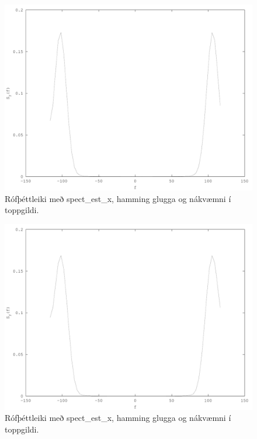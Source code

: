 \documentclass[11pt,a4paper]{article}
\begin{document}
\begin{figure}[htbp]
    \begin{center}
        \includegraphics[scale=0.5]{fig5.pdf}
    \end{center}
    \caption{Rófþéttleiki með spect\_est\_x, hamming glugga og nákvæmni í toppgildi.}
    \label{fig:hamming}
\end{figure}
\begin{figure}[htbp]
    \begin{center}
        \includegraphics[scale=0.5]{fig6.pdf}
    \end{center}
    \caption{Rófþéttleiki með spect\_est\_x, hamming glugga og nákvæmni í toppgildi.}
    \label{fig:hanning}
\end{figure}
\end{document}
